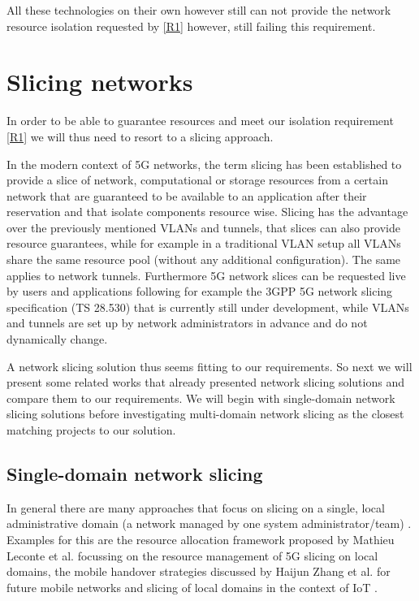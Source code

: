 All these technologies on their own however still can not provide the network resource isolation requested by \ref{R1} however, still failing this requirement.

\section{Slicing networks}
In order to be able to guarantee resources and meet our isolation requirement \ref{R1} we will thus need to resort to a slicing approach.

In the modern context of 5G networks, the term slicing has been established to provide a slice of network, computational or storage resources from a certain network that are guaranteed to be available to an application after their reservation \cite{5G1,5G2,5G3} and that isolate components resource wise. Slicing has the advantage over the previously mentioned VLANs and tunnels, that slices can also provide resource guarantees, while for example in a traditional VLAN setup all VLANs share the same resource pool (without any additional configuration). The same applies to network tunnels. Furthermore 5G network slices can be requested live by users and applications following for example the 3GPP 5G network slicing specification (TS 28.530) \cite{3gpp28.530} that is currently still under development, while VLANs and tunnels are set up by network administrators in advance and do not dynamically change.


A network slicing solution thus seems fitting to our requirements. So next we will present some related works that already presented network slicing solutions and compare them to our requirements. We will begin with single-domain network slicing solutions before investigating multi-domain network slicing as the closest matching projects to our solution.

\subsection{Single-domain network slicing} In general there are many approaches that focus on slicing on a single, local administrative domain (a network managed by one system administrator/team) \cite{SD1,SD2,SD3}. Examples for this are the resource allocation framework proposed by Mathieu Leconte et al. \cite{SD3} focussing on the resource management of 5G slicing on local domains, the mobile handover strategies discussed by Haijun Zhang et al. \cite{SD1} for future mobile networks and slicing of local domains in the context of IoT \cite{SD2}.

